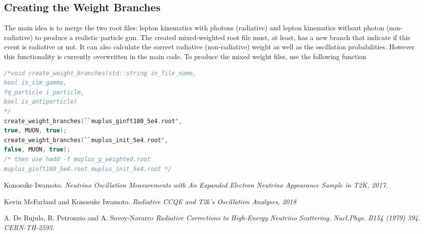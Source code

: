 \documentclass[12pt]{report}
\begin{document}
\subsection{Creating the Weight Branches}
The main idea is to merge the two root files: lepton kinematics with photons (radiative) and lepton kinematics without photon (non-radiative) to produce a realistic particle gun. The created mixed-weighted root file must, at least, has a new branch that indicate if this event is radiative or not. It can also calculate the correct radiative (non-radiative) weight as well as the oscillation probabilities. However this functionality is currently overwritten in the main code.
To produce the mixed weight files, use the following function 
\begin{lstlisting}[language=C++, caption=Creating Weight Branch Example]
/*void create_weight_branches(std::string in_file_name,
bool is_sim_gamma,
fq_particle i_particle,
bool is_antiparticle)
*/
create_weight_branches(``muplus_ginft180_5e4.root",
true, MUON, true);
create_weight_branches(``muplus_init_5e4.root",
false, MUON, true);
/* then use hadd -f muplus_g_weighted.root
muplus_ginft180_5e4.root muplus_init_5e4.root */							
\end{lstlisting} 



\begin{thebibliography}{9}
	Konosuke Iwamoto. 
	\textit{Neutrino Oscillation Measurements with An Expanded Electron Neutrino Appearance Sample in T2K, 2017.}
	
	
	Kevin McFarland and Konosuke Iwamoto.
	\textit{Radiative CCQE and T2k's Oscillation Analyses, 2018}
	
	A. De Rujula, R. Petronzio and A. Savoy-Navarro
	\textit{Radiative Corrections to High-Energy Neutrino Scattering. Nucl.Phys. B154 (1979) 394. CERN-TH-2593.}
	
\end{thebibliography}
	
\end{document}

